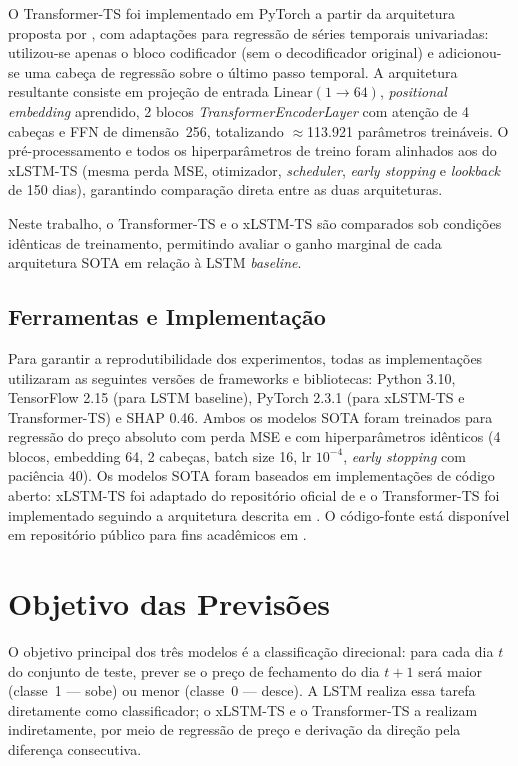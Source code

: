 \begin{itemize}
    O Transformer-TS foi implementado em PyTorch a partir da arquitetura proposta por , com adaptações para regressão de séries temporais univariadas: utilizou-se apenas o bloco codificador (sem o decodificador original) e adicionou-se uma cabeça de regressão sobre o último passo temporal. A arquitetura resultante consiste em projeção de entrada Linear$(1 \to 64)$, \textit{positional embedding} aprendido, 2 blocos \textit{TransformerEncoderLayer} com atenção de 4 cabeças e FFN de dimensão~256, totalizando $\approx$113.921 parâmetros treináveis. O pré-processamento e todos os hiperparâmetros de treino foram alinhados aos do xLSTM-TS (mesma perda MSE, otimizador, \textit{scheduler}, \textit{early stopping} e \textit{lookback} de 150 dias), garantindo comparação direta entre as duas arquiteturas.
\end{itemize}

Neste trabalho, o Transformer-TS e o xLSTM-TS são comparados sob condições idênticas de treinamento, permitindo avaliar o ganho marginal de cada arquitetura SOTA em relação à LSTM \textit{baseline}.

\subsection{Ferramentas e Implementação}

Para garantir a reprodutibilidade dos experimentos, todas as implementações utilizaram as seguintes versões de frameworks e bibliotecas: Python 3.10, TensorFlow 2.15 (para LSTM baseline), PyTorch 2.3.1 (para xLSTM-TS e Transformer-TS) e SHAP 0.46. Ambos os modelos SOTA foram treinados para regressão do preço absoluto com perda MSE e com hiperparâmetros idênticos (4 blocos, embedding 64, 2 cabeças, batch size 16, lr $10^{-4}$, \textit{early stopping} com paciência 40). Os modelos SOTA foram baseados em implementações de código aberto: xLSTM-TS foi adaptado do repositório oficial de  e o Transformer-TS foi implementado seguindo a arquitetura descrita em . O código-fonte está disponível em repositório público para fins acadêmicos em .

\section{Objetivo das Previsões}

O objetivo principal dos três modelos é a classificação direcional: para cada dia $t$ do conjunto de teste, prever se o preço de fechamento do dia $t+1$ será maior (classe~1 --- sobe) ou menor (classe~0 --- desce). A LSTM realiza essa tarefa diretamente como classificador; o xLSTM-TS e o Transformer-TS a realizam indiretamente, por meio de regressão de preço e derivação da direção pela diferença consecutiva.

